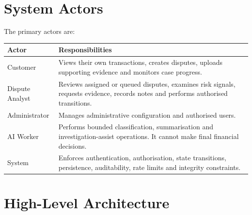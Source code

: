 \documentclass[11pt,a4paper]{article}
\begin{document}
\section{System Actors}

The primary actors are:

\begin{longtable}{p{}p{}}
\toprule
\textbf{Actor} & \textbf{Responsibilities} \\
\midrule

Customer &
Views their own transactions, creates disputes, uploads supporting
evidence and monitors case progress. \\

Dispute Analyst &
Reviews assigned or queued disputes, examines risk signals, requests
evidence, records notes and performs authorised transitions. \\

Administrator &
Manages administrative configuration and authorised users. \\

AI Worker &
Performs bounded classification, summarisation and investigation-assist
operations. It cannot make final financial decisions. \\

System &
Enforces authentication, authorisation, state transitions, persistence,
auditability, rate limits and integrity constraints. \\

\bottomrule
\end{longtable}

\section{High-Level Architecture}
\end{document}
